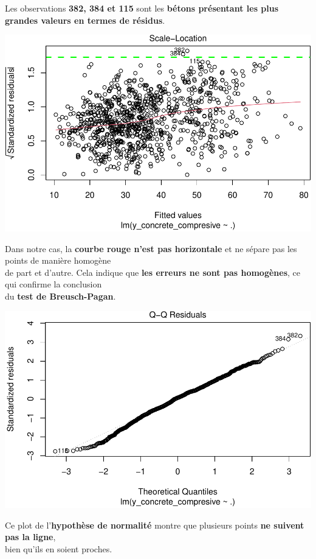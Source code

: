 \documentclass[
  12pt,
]{article}
\begin{document}
Les observations \textbf{382, 384 et 115} sont les \textbf{bétons
présentant les plus grandes valeurs en termes de résidus}.

\includegraphics{rmd_final_files/figure-latex/unnamed-chunk-36-1.pdf}

Dans notre cas, la \textbf{courbe rouge n'est pas horizontale} et ne
sépare pas les points de manière homogène\\
de part et d'autre. Cela indique que \textbf{les erreurs ne sont pas
homogènes}, ce qui confirme la conclusion\\
du \textbf{test de Breusch-Pagan}.

\includegraphics{rmd_final_files/figure-latex/unnamed-chunk-37-1.pdf}

Ce plot de l'\textbf{hypothèse de normalité} montre que plusieurs points
\textbf{ne suivent pas la ligne},\\
bien qu'ils en soient proches.
\end{document}
